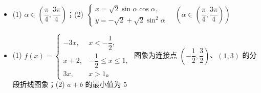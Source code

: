 \begin{itemize}[leftmargin=2.6em]
  \item[\textbf{22.}] (1) $\alpha \in \left(\dfrac\pi4, \dfrac{3\pi}{4}\right)$；(2) $\begin{cases} x = \sqrt2\sin\alpha\cos\alpha, \\ y = -\sqrt2 + \sqrt2\sin^2\alpha \end{cases} \quad \left(\alpha \in \left(\dfrac\pi4, \dfrac{3\pi}{4}\right)\right)$
  \item[\textbf{23.}] (1) $f(x) = \begin{cases} -3x, & x < -\dfrac12, \\ x + 2, & -\dfrac12 \leqslant x \leqslant 1, \\ 3x, & x > 1\text{。} \end{cases}$ 图象为连接点 $\left(-\dfrac12, \dfrac32\right)$、$(1, 3)$ 的分段折线图象；(2) $a + b$ 的最小值为 $5$
\end{itemize}
